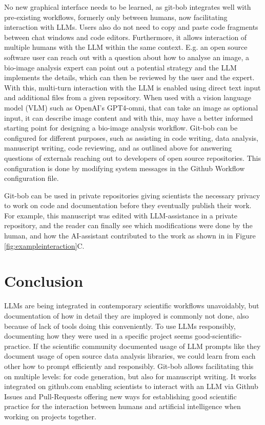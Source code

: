 \documentclass{ecai}
\begin{document}
No new graphical interface needs to be learned, as git-bob integrates well with pre-existing workflows, formerly only between humans, now facilitating interaction with LLMs. Users also do not need to copy and paste code fragments between chat windows and code editors. Furthermore, it allows interaction of multiple humans with the LLM within the same context. E.g. an open source software user can reach out with a question about how to analyse an image, a bio-image analysis expert can point out a potential  strategy and the LLM implements the details, which can then be reviewed by the user and the expert. With this, multi-turn interaction with the LLM is enabled using direct text input and additional files from a given repository. When used with a vision language model (VLM) such as OpenAI's GPT4-omni, that can take an image as optional input, it can describe image content and with this, may have a better informed starting point for designing a bio-image analysis workflow.
Git-bob can be configured for different purposes, such as assisting in code writing, data analysis, manuscript writing, code reviewing, and as outlined above for answering questions of externals reaching out to developers of open source repositories. This configuration is done by modifying system messages in the Github Workflow configuration file. 

Git-bob can be used in private repositories giving scientists the necessary privacy to work on code and documentation before they eventually publish their work. For example, this manuscript was edited with LLM-assistance in a private repository, and the reader can finally see which modifications were done by the human, and how the AI-assistant contributed to the work as shown in in Figure \ref{fig:exampleinteraction}C.


\section{Conclusion}

LLMs are being integrated in contemporary scientific workflows unavoidably, but documentation of how in detail they are imployed is commonly not done, also because of lack of tools doing this conveniently. To use LLMs responsibly, documenting how they were used in a specific project seems good-scientific-practice. If the scientific community documented usage of LLM prompts like they document usage of open source data analysis libraries, we could learn from each other how to prompt efficiently and responsibly. Git-bob allows facilitating this on multiple levels: for code generation, but also for manuscript writing. It works integrated on github.com enabling scientists to interact with an LLM via Github Issues and Pull-Requests offering new ways for establishing good scientific practice for the interaction between humans and artificial intelligence when working on projects together.
\end{document}
